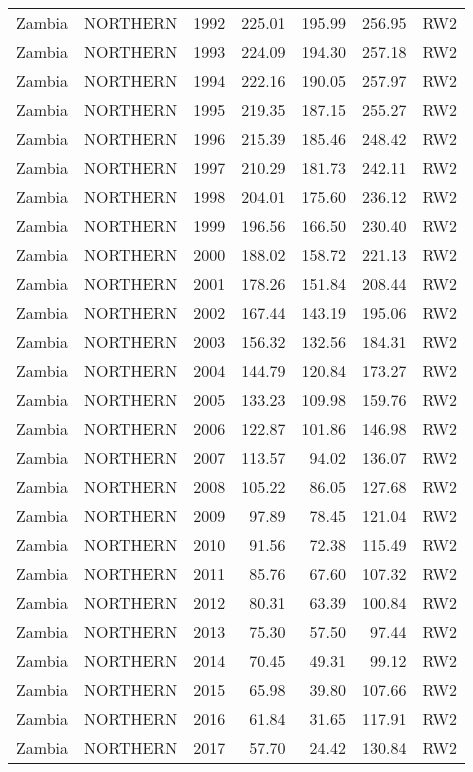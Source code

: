 \begin{longtable}{lllrrrl}
  Zambia & NORTHERN & 1992 & 225.01 & 195.99 & 256.95 & RW2 \\ 
  Zambia & NORTHERN & 1993 & 224.09 & 194.30 & 257.18 & RW2 \\ 
  Zambia & NORTHERN & 1994 & 222.16 & 190.05 & 257.97 & RW2 \\ 
  Zambia & NORTHERN & 1995 & 219.35 & 187.15 & 255.27 & RW2 \\ 
  Zambia & NORTHERN & 1996 & 215.39 & 185.46 & 248.42 & RW2 \\ 
  Zambia & NORTHERN & 1997 & 210.29 & 181.73 & 242.11 & RW2 \\ 
  Zambia & NORTHERN & 1998 & 204.01 & 175.60 & 236.12 & RW2 \\ 
  Zambia & NORTHERN & 1999 & 196.56 & 166.50 & 230.40 & RW2 \\ 
  Zambia & NORTHERN & 2000 & 188.02 & 158.72 & 221.13 & RW2 \\ 
  Zambia & NORTHERN & 2001 & 178.26 & 151.84 & 208.44 & RW2 \\ 
  Zambia & NORTHERN & 2002 & 167.44 & 143.19 & 195.06 & RW2 \\ 
  Zambia & NORTHERN & 2003 & 156.32 & 132.56 & 184.31 & RW2 \\ 
  Zambia & NORTHERN & 2004 & 144.79 & 120.84 & 173.27 & RW2 \\ 
  Zambia & NORTHERN & 2005 & 133.23 & 109.98 & 159.76 & RW2 \\ 
  Zambia & NORTHERN & 2006 & 122.87 & 101.86 & 146.98 & RW2 \\ 
  Zambia & NORTHERN & 2007 & 113.57 & 94.02 & 136.07 & RW2 \\ 
  Zambia & NORTHERN & 2008 & 105.22 & 86.05 & 127.68 & RW2 \\ 
  Zambia & NORTHERN & 2009 & 97.89 & 78.45 & 121.04 & RW2 \\ 
  Zambia & NORTHERN & 2010 & 91.56 & 72.38 & 115.49 & RW2 \\ 
  Zambia & NORTHERN & 2011 & 85.76 & 67.60 & 107.32 & RW2 \\ 
  Zambia & NORTHERN & 2012 & 80.31 & 63.39 & 100.84 & RW2 \\ 
  Zambia & NORTHERN & 2013 & 75.30 & 57.50 & 97.44 & RW2 \\ 
  Zambia & NORTHERN & 2014 & 70.45 & 49.31 & 99.12 & RW2 \\ 
  Zambia & NORTHERN & 2015 & 65.98 & 39.80 & 107.66 & RW2 \\ 
  Zambia & NORTHERN & 2016 & 61.84 & 31.65 & 117.91 & RW2 \\ 
  Zambia & NORTHERN & 2017 & 57.70 & 24.42 & 130.84 & RW2 \\ 

\end{longtable}
